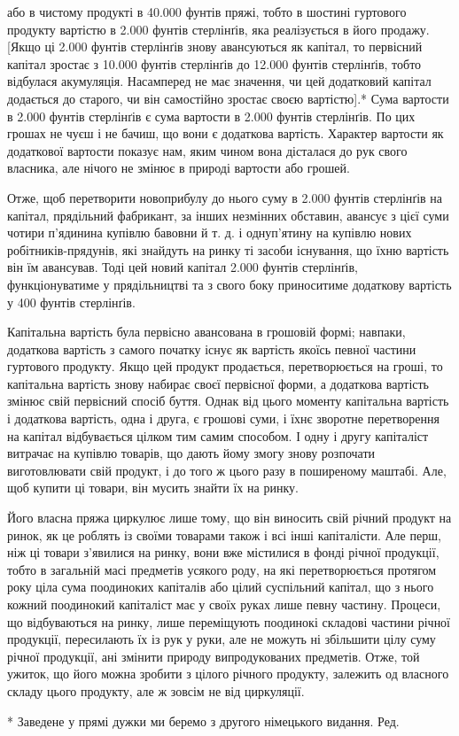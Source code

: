 або в чистому продукті в 40.000 фунтів пряжі, тобто в шостині
гуртового продукту вартістю в 2.000 фунтів стерлінґів, яка
реалізується в його продажу. [Якщо ці 2.000 фунтів стерлінґів
знову авансуються як капітал, то первісний капітал зростає
з 10.000 фунтів стерлінґів до 12.000 фунтів стерлінґів, тобто
відбулася акумуляція. Насамперед не має значення, чи цей додатковий
капітал додається до старого, чи він самостійно зростає
своєю вартістю].* Сума вартости в 2.000 фунтів стерлінґів є сума
вартости в 2.000 фунтів стерлінґів. По цих грошах не чуєш і не
бачиш, що вони є додаткова вартість. Характер вартости як додаткової
вартости показує нам, яким чином вона дісталася до
рук свого власника, але нічого не змінює в природі вартости
або грошей.

Отже, щоб перетворити новоприбулу до нього суму в 2.000 фунтів
стерлінґів на капітал, прядільний фабрикант, за інших незмінних
обставин, авансує з цієї суми чотири п’ядинина купівлю
бавовни й т. д. і однуп’ятину на купівлю нових робітників-прядунів,
які знайдуть на ринку ті засоби існування, що їхню вартість
він їм авансував. Тоді цей новий капітал 2.000 фунтів
стерлінґів, функціонуватиме у прядільництві та з свого боку
приноситиме додаткову вартість у 400 фунтів стерлінґів.

Капітальна вартість була первісно авансована в грошовій
формі; навпаки, додаткова вартість з самого початку існує як
вартість якоїсь певної частини гуртового продукту. Якщо цей
продукт продається, перетворюється на гроші, то капітальна
вартість знову набирає своєї первісної форми, а додаткова вартість
змінює свій первісний спосіб буття. Однак від цього моменту
капітальна вартість і додаткова вартість, одна і друга, є грошові
суми, і їхнє зворотне перетворення на капітал відбувається цілком
тим самим способом. І одну і другу капіталіст витрачає на
купівлю товарів, що дають йому змогу знову розпочати виготовлювати
свій продукт, і до того ж цього разу в поширеному
маштабі. Але, щоб купити ці товари, він мусить знайти їх на ринку.

Його власна пряжа циркулює лише тому, що він виносить
свій річний продукт на ринок, як це роблять із своїми товарами
також і всі інші капіталісти. Але перш, ніж ці товари з’явилися
на ринку, вони вже містилися в фонді річної продукції, тобто в
загальній масі предметів усякого роду, на які перетворюється
протягом року ціла сума поодиноких капіталів або цілий суспільний
капітал, що з нього кожний поодинокий капіталіст має
у своїх руках лише певну частину. Процеси, що відбуваються на
ринку, лише переміщують поодинокі складові частини річної
продукції, пересилають їх із рук у руки, але не можуть ні збільшити
цілу суму річної продукції, ані змінити природу випродукованих
предметів. Отже, той ужиток, що його можна зробити
з цілого річного продукту, залежить од власного складу цього
продукту, але ж зовсім не від циркуляції.

* Заведене у прямі дужки ми беремо з другого німецького видання.
Ред.
